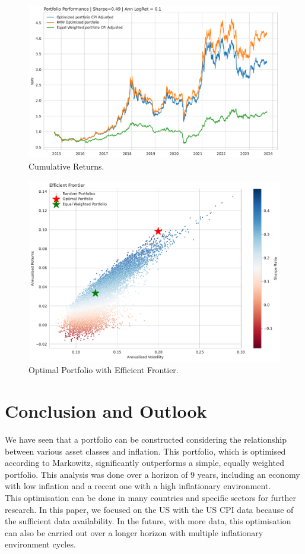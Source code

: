 \documentclass{article}
\begin{document}
\begin{figure}[H]
    \centering
    \includegraphics[width=1\textwidth]{paper/figure/PNL.pdf}
    \caption{Cumulative Returns.}
    \label{fig:mesh4}
\end{figure}

\begin{figure}[H]
    \centering
    \includegraphics[width=1\textwidth]{paper/figure/Optimal_PF.pdf}
    \caption{Optimal Portfolio with Efficient Frontier.}
    \label{fig:mesh5}
\end{figure}

\newpage

\section{Conclusion and Outlook}

We have seen that a portfolio can be constructed considering the relationship between various asset classes and inflation. This portfolio, which is optimised according to Markowitz, significantly outperforms a simple, equally weighted portfolio. This analysis was done over a horizon of 9 years, including an economy with low inflation and a recent one with a high inflationary environment. \\

This optimisation can be done in many countries and specific sectors for further research. In this paper, we focused on the US with the US CPI data because of the sufficient data availability. In the future, with more data, this optimisation can also be carried out over a longer horizon with multiple inflationary environment cycles.
\end{document}
